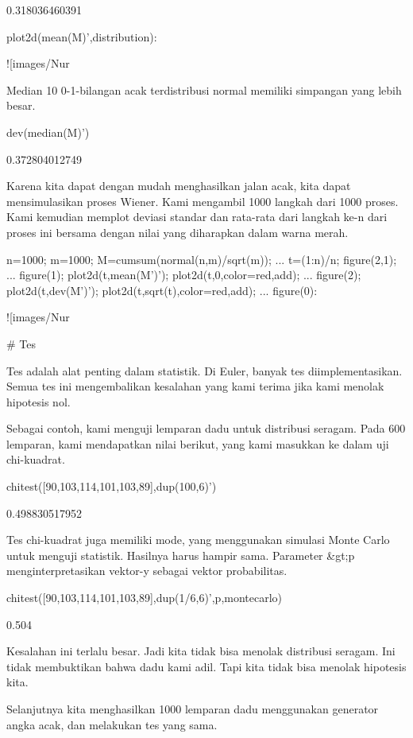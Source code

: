 \documentclass{article}
\begin{document}
    0.318036460391

\>plot2d(mean(M)',\>distribution):


![images/Nur%

Median 10 0-1-bilangan acak terdistribusi normal memiliki simpangan
yang lebih besar.


\>dev(median(M)')


    0.372804012749

Karena kita dapat dengan mudah menghasilkan jalan acak, kita dapat
mensimulasikan proses Wiener. Kami mengambil 1000 langkah dari 1000
proses. Kami kemudian memplot deviasi standar dan rata-rata dari
langkah ke-n dari proses ini bersama dengan nilai yang diharapkan
dalam warna merah.


\>n=1000; m=1000; M=cumsum(normal(n,m)/sqrt(m)); ...  
\>   t=(1:n)/n; figure(2,1); ...  
\>   figure(1); plot2d(t,mean(M')'); plot2d(t,0,color=red,\>add); ...  
\>   figure(2); plot2d(t,dev(M')'); plot2d(t,sqrt(t),color=red,\>add); ...  
\>   figure(0):


![images/Nur%

# Tes

Tes adalah alat penting dalam statistik. Di Euler, banyak tes
diimplementasikan. Semua tes ini mengembalikan kesalahan yang kami
terima jika kami menolak hipotesis nol.


Sebagai contoh, kami menguji lemparan dadu untuk distribusi seragam.
Pada 600 lemparan, kami mendapatkan nilai berikut, yang kami masukkan
ke dalam uji chi-kuadrat.


\>chitest([90,103,114,101,103,89],dup(100,6)')


    0.498830517952

Tes chi-kuadrat juga memiliki mode, yang menggunakan simulasi Monte
Carlo untuk menguji statistik. Hasilnya harus hampir sama. Parameter
&gt;p menginterpretasikan vektor-y sebagai vektor probabilitas.


\>chitest([90,103,114,101,103,89],dup(1/6,6)',\>p,\>montecarlo)


    0.504

Kesalahan ini terlalu besar. Jadi kita tidak bisa menolak distribusi
seragam. Ini tidak membuktikan bahwa dadu kami adil. Tapi kita tidak
bisa menolak hipotesis kita.


Selanjutnya kita menghasilkan 1000 lemparan dadu menggunakan generator
angka acak, dan melakukan tes yang sama.
\end{document}
